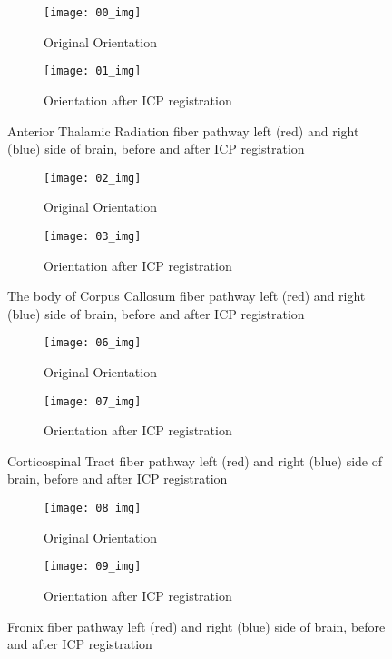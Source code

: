 \documentclass[../structure.tex]{subfiles}
\begin{document}
\begin{figure}[H]
	\centering
	\begin{subfigure}[b]{0.49\textwidth}
	\centering
	\texttt{[image: 00\_img]}
	\caption{Original Orientation}
	\end{subfigure}
	\begin{subfigure}[b]{0.49\textwidth}
	\centering
	\texttt{[image: 01\_img]}
	\caption{Orientation after ICP registration}
	\end{subfigure}
\captionsetup{justification=centering}
\caption{Anterior Thalamic Radiation fiber pathway left (red) and right (blue) side of brain, before and after ICP registration}
\label{fig:pca}
\end{figure}

\begin{figure}[H]
	\centering
	\begin{subfigure}[b]{0.49\textwidth}
	\centering
	\texttt{[image: 02\_img]}
	\caption{Original Orientation}
	\end{subfigure}
	\begin{subfigure}[b]{0.49\textwidth}
	\centering
	\texttt{[image: 03\_img]}
	\caption{Orientation after ICP registration}
	\end{subfigure}
\captionsetup{justification=centering}
\caption{The body of Corpus Callosum fiber pathway left (red) and right (blue) side of brain, before and after ICP registration}
\label{fig:pca}
\end{figure}

\begin{figure}[H]
	\centering
	\begin{subfigure}[b]{0.49\textwidth}
	\centering
	\texttt{[image: 06\_img]}
	\caption{Original Orientation}
	\end{subfigure}
	\begin{subfigure}[b]{0.49\textwidth}
	\centering
	\texttt{[image: 07\_img]}
	\caption{Orientation after ICP registration}
	\end{subfigure}
\captionsetup{justification=centering}
\caption{Corticospinal Tract fiber pathway left (red) and right (blue) side of brain, before and after ICP registration}
\label{fig:pca}
\end{figure}

\begin{figure}[H]
	\centering
	\begin{subfigure}[b]{0.49\textwidth}
	\centering
	\texttt{[image: 08\_img]}
	\caption{Original Orientation}
	\end{subfigure}
	\begin{subfigure}[b]{0.49\textwidth}
	\centering
	\texttt{[image: 09\_img]}
	\caption{Orientation after ICP registration}
	\end{subfigure}
\captionsetup{justification=centering}
\caption{Fronix fiber pathway left (red) and right (blue) side of brain, before and after ICP registration}
\label{fig:pca}
\end{figure}
\end{document}

